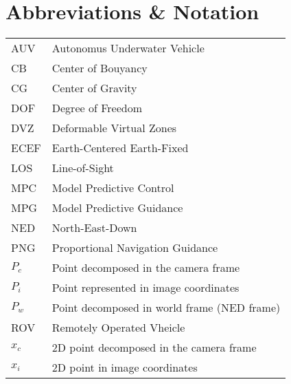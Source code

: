 \chapter{Abbreviations \& Notation}
\begin{center}
\begin{tabular}{|l|l|}
\hline
AUV & Autonomus Underwater Vehicle \\
CB & Center of Bouyancy\\
CG & Center of Gravity \\
DOF & Degree of Freedom \\
DVZ & Deformable Virtual Zones \\
ECEF & Earth-Centered Earth-Fixed \\
LOS & Line-of-Sight\\
MPC & Model Predictive Control \\
MPG & Model Predictive Guidance\\
NED & North-East-Down \\
PNG & Proportional Navigation Guidance \\
$P_c$ & Point decomposed in the camera frame \\
$P_i$ & Point represented in image coordinates \\
$P_w$ & Point decomposed in world frame (NED frame) \\
ROV & Remotely Operated Vheicle \\
$x_c$ & 2D point decomposed in the camera frame \\
$x_i$ & 2D point in image coordinates \\
\hline
\end{tabular}
\end{center}
